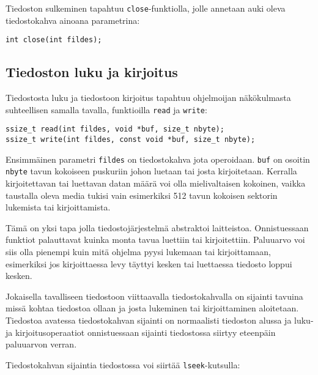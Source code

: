 Tiedoston sulkeminen tapahtuu \texttt{close}-funktiolla,
jolle annetaan auki oleva tiedostokahva ainoana parametrina:

\begin{verbatim}
int close(int fildes);
\end{verbatim}

\subsection{Tiedoston luku ja kirjoitus}

Tiedostosta luku ja tiedostoon kirjoitus tapahtuu ohjelmoijan näkökulmasta suhteellisen
samalla tavalla, funktioilla \texttt{read} ja \texttt{write}:

\begin{verbatim}
ssize_t read(int fildes, void *buf, size_t nbyte);
ssize_t write(int fildes, const void *buf, size_t nbyte);
\end{verbatim}

Ensimmäinen parametri \texttt{fildes} on tiedostokahva jota operoidaan.
\texttt{buf} on osoitin \texttt{nbyte} tavun kokoiseen puskuriin johon
luetaan tai josta kirjoitetaan.
Kerralla kirjoitettavan tai luettavan datan määrä voi olla mielivaltaisen kokoinen,
vaikka taustalla oleva media tukisi vain esimerkiksi 512 tavun kokoisen sektorin lukemista tai kirjoittamista.

Tämä on yksi tapa jolla tiedostojärjestelmä abstraktoi laitteistoa.
Onnistuessaan funktiot palauttavat kuinka monta tavua luettiin tai kirjoitettiin.
Paluuarvo voi siis olla pienempi kuin mitä ohjelma pyysi lukemaan tai kirjoittamaan,
esimerkiksi jos kirjoittaessa levy täyttyi kesken tai luettaessa
tiedosto loppui kesken.

Jokaisella tavalliseen tiedostoon viittaavalla tiedostokahvalla on sijainti tavuina missä kohtaa tiedostoa ollaan ja josta lukeminen tai kirjoittaminen aloitetaan.
Tiedostoa avatessa tiedostokahvan sijainti on normaalisti tiedoston alussa ja luku- ja kirjoitusoperaatiot onnistuessaan sijainti tiedostossa siirtyy eteenpäin paluuarvon verran.

Tiedostokahvan sijaintia tiedostossa voi siirtää \texttt{lseek}-kutsulla:


